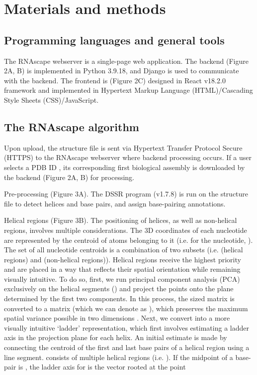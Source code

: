 \section{Materials and methods} 

\subsection{Programming languages and general tools}

The RNAscape webserver is a single-page web application. The backend (Figure 2A, B) is implemented in Python 3.9.18, and Django \citep{Django2019} is used to communicate with the backend. The frontend is (Figure 2C) designed in React v18.2.0 framework and implemented in Hypertext Markup Language (HTML)/Cascading Style Sheets (CSS)/JavaScript.

\subsection{The RNAscape algorithm}

Upon upload, the structure file is sent via Hypertext Transfer Protocol Secure (HTTPS) to the RNAscape webserver where backend processing occurs. If a user selects a PDB ID \citep{berman2000protein}, its corresponding first biological assembly is downloaded by the backend (Figure 2A, B) for processing.

Pre-processing (Figure 3A). The DSSR program (v1.7.8) \citep{lu2015dssr} is run on the structure file to detect helices and base pairs, and assign base-pairing annotations.

Helical regions (Figure 3B). The positioning of helices, as well as non-helical regions, involves multiple considerations. The 3D coordinates of each nucleotide are represented by the centroid of atoms belonging to it (i.e. for the nucleotide,
). The set of all nucleotide centroids is a combination of two subsets (i.e. (helical regions) and (non-helical regions)). Helical regions receive the highest priority and are placed in a way that reflects their spatial orientation while remaining visually intuitive. To do so, first, we run principal component analysis (PCA) exclusively on the helical segments () and project the points onto the plane determined by the first two components. In this process, the  sized matrix is converted to a matrix (which we can denote as ), which preserves the maximum spatial variance possible in two dimensions \citep{Pearson1901}. Next, we convert into a more visually intuitive ‘ladder’ representation, which first involves estimating a ladder axis in the projection plane for each helix. An initial estimate is made by connecting the centroid of the first and last base pairs of a helical region using a line segment. consists of multiple helical regions (i.e. ). If the midpoint of a base-pair is
, the ladder axis for is the vector
rooted at the point

